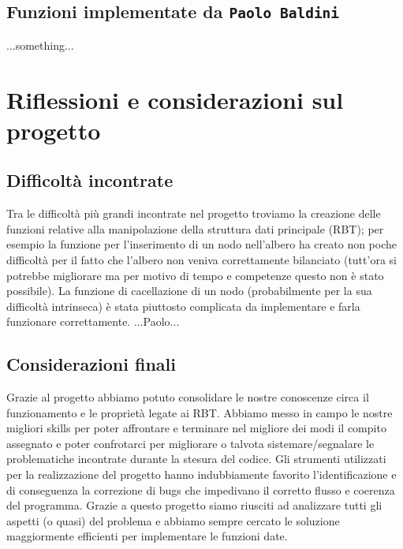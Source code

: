 \documentclass[paper=a4, fontsize=11pt,twoside]{scrartcl}   %
\begin{document}
			\subsection{Funzioni implementate da \texttt{Paolo Baldini}}
				...something...
			\pagebreak
		\section{Riflessioni e considerazioni sul progetto}
			\subsection{Difficoltà incontrate}
				Tra le difficoltà più grandi incontrate nel progetto troviamo la creazione delle funzioni relative alla manipolazione della struttura dati principale (RBT); per esempio la funzione per l'inserimento di un nodo nell'albero ha creato non poche difficoltà per il fatto che l'albero non veniva correttamente bilanciato (tutt'ora si potrebbe migliorare ma per motivo di tempo e competenze questo non è stato possibile). La funzione di cacellazione di un nodo (probabilmente per la sua difficoltà intrinseca)  è stata piuttosto complicata da implementare e farla funzionare correttamente. ...Paolo...
				
			\subsection{Considerazioni finali}
				Grazie al progetto abbiamo potuto consolidare le nostre conoscenze circa il funzionamento e le proprietà legate ai RBT. Abbiamo messo in campo le nostre migliori skills per poter affrontare e terminare nel migliore dei modi il compito assegnato e poter confrotarci per migliorare o talvota sistemare/segnalare le problematiche incontrate durante la stesura del codice. Gli strumenti utilizzati per la realizzazione del progetto hanno indubbiamente favorito l'identificazione e di conseguenza la correzione di bugs che impedivano il corretto flusso e coerenza del programma.
				Grazie a questo progetto siamo riusciti ad analizzare tutti gli aspetti (o quasi) del problema e abbiamo sempre cercato le soluzione maggiormente efficienti per implementare le funzioni date.

								
		 
\end{document}
